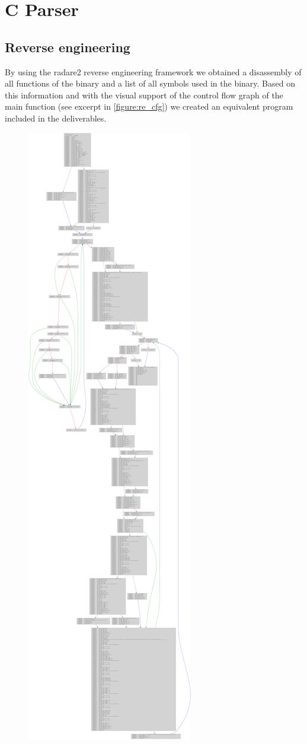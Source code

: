\newpage
\section{C Parser}
\subsection{Reverse engineering}
By using the radare2 reverse engineering framework we obtained a disassembly of
all functions of the binary and a list of all symbols used in the binary.
Based on this information and with the visual support of the control flow graph
of the main function (see excerpt in \autoref{figure:re_cfg}) we created an
equivalent program included in the deliverables.

\begin{figure}[h!tbp]
	\centering
	\includegraphics[trim={5cm 218cm 25cm 0},clip,height=\textheight]{figures/re_cfg}

\end{figure}
